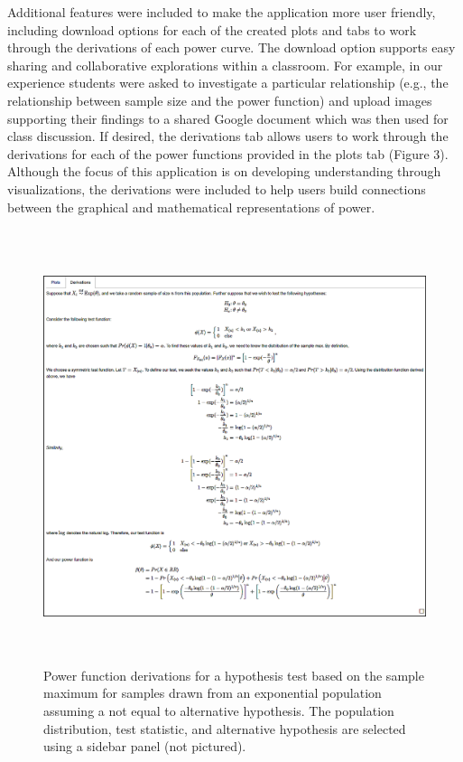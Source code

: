 \documentclass{TISE}
\begin{document}
Additional features were included to make the application more user friendly, including  download options for each of the created plots and tabs to work through the derivations of each power curve. The download option supports easy sharing and collaborative explorations within a classroom. For example, in our experience students were asked to investigate a particular relationship (e.g., the relationship between sample size and the power function) and upload images supporting their findings to a shared Google document which was then used for class discussion. If desired, the derivations tab allows users to work through the derivations for each of the power functions provided in the plots tab (Figure 3). Although the focus of this application is on developing understanding through visualizations, the derivations were included to help users build connections between the graphical and mathematical representations of power.

\begin{figure}[H]
	\centering
	\includegraphics[height=5in]{fig3.png}
	\caption{Power function derivations for a hypothesis test based on the sample maximum for samples drawn from an exponential population assuming a not equal to alternative hypothesis. The population distribution, test statistic, and alternative hypothesis are selected using a sidebar panel (not pictured).}
\end{figure}
\end{document}
